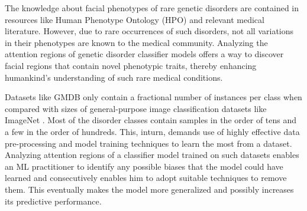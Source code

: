 \documentclass[../report.tex]{subfiles}
\begin{document}
    The knowledge about facial phenotypes of rare genetic disorders are contained in resources like Human Phenotype Ontology (HPO) \cite{hpo} and relevant medical literature. However, due to rare occurrences of such disorders, not all variations in their phenotypes are known to the medical community. Analyzing the attention regions of genetic disorder classifier models offers a way to discover facial regions that contain novel phenotypic traits, thereby enhancing humankind's understanding of such rare medical conditions.
    
    Datasets like GMDB only contain a fractional number of instances per class when compared with sizes of general-purpose image classification datasets like ImageNet \cite{deng2009imagenet}. Most of the disorder classes contain samples in the order of tens and a few in the order of hundreds. This, inturn,  demands use of highly effective data pre-processing and model training techniques to learn the most from a dataset. Analyzing attention regions of a classifier model trained on such datasets enables an ML practitioner to identify any possible biases that the model could have learned and consecutively enables him to adopt suitable techniques to remove them. This eventually makes the model more generalized and possibly increases its predictive performance. 
    
\end{document}
